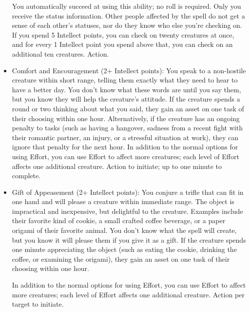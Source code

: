 \begin{multicols}{2}
\begin{itemize}
You automatically succeed at using this ability; no roll is required. Only you receive the status information. Other people affected by the spell do not get a sense of each other’s statuses, nor do they know who else you’re checking on. 
If you spend 5 Intellect points, you can check on twenty creatures at once, and for every 1 Intellect point you spend above that, you can check on an additional ten creatures. Action.

\item Comfort and Encouragement (2+ Intellect points): You speak to a non-hostile creature within short range, telling them exactly what they need to hear to have a better day. You don’t know what these words are until you say them, but you know they will help the creature’s attitude. If the creature spends a round or two thinking about what you said, they gain an asset on one task of their choosing within one hour. Alternatively, if the creature has an ongoing penalty to tasks (such as having a hangover, sadness from a recent fight with their romantic partner, an injury, or a stressful situation at work), they can ignore that penalty for the next hour. In addition to the normal options for using Effort, you can use Effort to affect more creatures; each level of Effort affects one additional creature. Action to initiate; up to one minute to complete. 

\item Gift of Appeasement (2+ Intellect points): You conjure a trifle that can fit in one hand and will please a creature within immediate range. The object is impractical and inexpensive, but delightful to the creature. Examples include their favorite kind of cookie, a small crafted coffee beverage, or a paper origami of their favorite animal. You don’t know what the spell will create, but you know it will please them if you give it as a gift. If the creature spends one minute appreciating the object (such as eating the cookie, drinking the coffee, or examining the origami), they gain an asset on one task of their choosing within one hour. 

In addition to the normal options for using Effort, you can use Effort to affect more creatures; each level of Effort affects one additional creature. Action per target to initiate.
\end{itemize}


\end{multicols}
